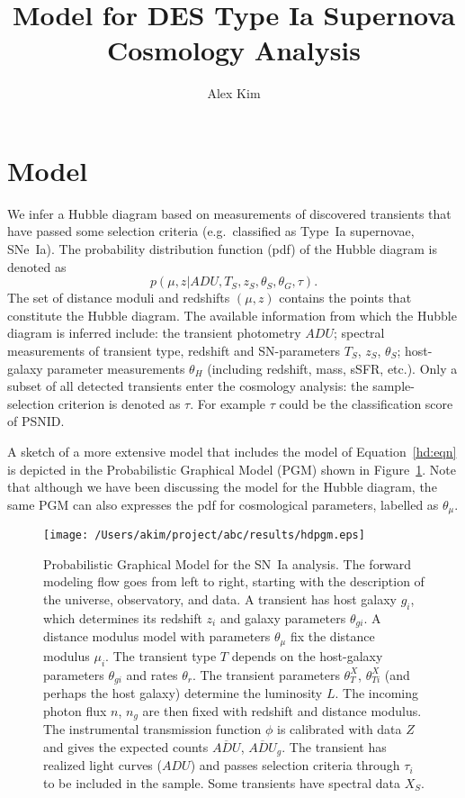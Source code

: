 \documentclass[preprint]{aastex}
\begin{document}
\title{Model for DES Type Ia Supernova Cosmology Analysis}
\author{Alex Kim}

\section{Model}
We infer a Hubble diagram based on measurements of discovered transients
that have passed some selection criteria (e.g.\ classified as Type~Ia supernovae, SNe~Ia).  The probability distribution
function (pdf) of the Hubble diagram is denoted as
\begin{equation}
p({\mu},{z} |  {{ADU}}, {{T}}_S,{{z}}_S,
{{\theta}}_S, \theta_G, \tau).
\label{hd:eqn}
\end{equation}
The set of distance moduli
and redshifts $(\mu, z)$ contains the points that constitute the Hubble diagram.  The available information
from which the Hubble diagram is inferred include:
the transient photometry ${ADU}$; spectral measurements of
transient
type, redshift and SN-parameters ${T}_S$, ${z}_S$, ${\theta}_S$;
host-galaxy parameter measurements $\theta_H$ (including redshift,
mass, sSFR, etc.).  Only a subset of all detected transients enter the cosmology
analysis: the sample-selection criterion is denoted as $\tau$.  For example
$\tau$ could be the classification score of PSNID.

A sketch of a more extensive model that includes the
model of Equation~\ref{hd:eqn} is depicted in the Probabilistic Graphical Model
(PGM)
shown in Figure~\ref{pgm:fig}.
Note that although we have been discussing the model for the Hubble diagram, the same PGM can
also expresses the pdf for cosmological
parameters, labelled as $\theta_\mu$.

\begin{figure}[htbp] %
   \centering
   \texttt{[image: /Users/akim/project/abc/results/hdpgm.eps]} 
   \caption{Probabilistic Graphical Model for the SN~Ia analysis.  
   The forward modeling
   flow goes from left to right, starting with the description of the universe, observatory,
   and data.    A transient has host galaxy $g_i$, which determines its redshift $z_i$
   and galaxy parameters $\theta_{gi}$.
   A distance modulus model with parameters $\theta_\mu$ fix the distance modulus $\mu_i$.
   The transient type $T$ depends on the host-galaxy parameters  $\theta_{gi}$
   and rates $\theta_r$.   The transient
   parameters $\theta_T^X$, $\theta_{Ti}^X$ (and perhaps the host galaxy) determine the luminosity $L$.       The 
   incoming photon flux $n$, $n_g$  are then fixed
   with redshift and distance modulus.
   The instrumental transmission function $\phi$ is calibrated with data ${Z}$ and
   gives the expected
   counts $\overline{\mathit{ADU}}$, $\overline{\mathit{ADU}}_g$. 
   The transient has realized light curves (${ADU}$) and passes selection criteria
   through $\tau_i$ to be included in the sample.  Some transients have spectral data
   ${X}_S$.
   \label{pgm:fig}}
\end{figure}
\end{document}
